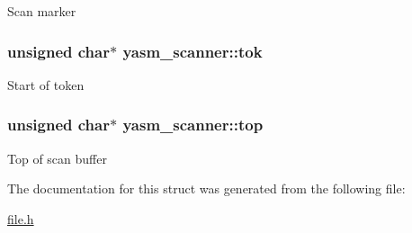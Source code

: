 Scan marker \hypertarget{structyasm__scanner_a056e33a79082abaa3a75c13729719416}{
\subsubsection[{tok}]{\setlength{\rightskip}{0pt plus 5cm}unsigned char$\ast$ yasm\-\_\-scanner\-::tok}}\label{structyasm__scanner_a056e33a79082abaa3a75c13729719416}
Start of token \hypertarget{structyasm__scanner_a7b71663793493f82599d7a9fe6bcb665}{
\subsubsection[{top}]{\setlength{\rightskip}{0pt plus 5cm}unsigned char$\ast$ yasm\-\_\-scanner\-::top}}\label{structyasm__scanner_a7b71663793493f82599d7a9fe6bcb665}
Top of scan buffer 

The documentation for this struct was generated from the following file\-:\begin{DoxyCompactItemize}
\item 
\hyperlink{file_8h}{file.\-h}\end{DoxyCompactItemize}
